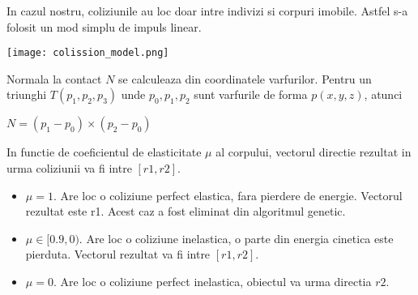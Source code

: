 In cazul nostru, coliziunile au loc doar intre indivizi si corpuri imobile. Astfel s-a folosit un mod simplu de impuls linear.

\begin{center}
    \texttt{[image: colission\_model.png]}
\end{center}

Normala la contact $N$ se calculeaza din coordinatele varfurilor. Pentru un triunghi $T(p_{1},p_{2},p_{3})$ unde $p_{0},p_{1},p_{2}$ sunt varfurile de forma $p(x,y,z)$, atunci 
\begin{center}
    $N = (p_{1}-p_{0}) \times (p_{2}-p_{0})$
\end{center}

In functie de coeficientul de elasticitate $\mu$ al corpului, vectorul directie rezultat in urma coliziunii va fi intre $[r1,r2]$.
\begin{itemize}
    \item $\mu = 1$. Are loc o coliziune perfect elastica, fara pierdere de energie. Vectorul rezultat este r1. Acest caz a fost eliminat din algoritmul genetic.
    \item $\mu \in [0.9,0)$. Are loc o coliziune inelastica, o parte din energia cinetica este pierduta. Vectorul rezultat va fi intre $[r1,r2]$.
    \item $\mu = 0$. Are loc o coliziune perfect inelastica, obiectul va urma directia $r2$.
\end{itemize}
